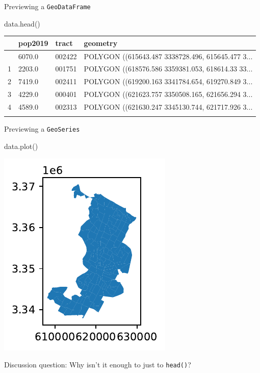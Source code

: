 \documentclass[
  ignorenonframetext,
]{beamer}
\newenvironment{Shaded}{\begin{snugshade}}{\end{snugshade}}
\newcommand{\NormalTok}[1]{\textcolor[rgb]{0.00,0.23,0.31}{#1}}
\begin{document}
\begin{frame}[fragile]{Previewing a \texttt{GeoDataFrame}}
\label{previewing-a-geodataframe}
\begin{Shaded}
\begin{Highlighting}[]
\NormalTok{data.head()}
\end{Highlighting}
\end{Shaded}

\begin{longtable}[]{@{}llll@{}}
\toprule\noalign{}
& pop2019 & tract & geometry \\
\midrule\noalign{}
\endhead
0 & 6070.0 & 002422 & POLYGON ((615643.487 3338728.496, 615645.477
3... \\
1 & 2203.0 & 001751 & POLYGON ((618576.586 3359381.053, 618614.33
33... \\
2 & 7419.0 & 002411 & POLYGON ((619200.163 3341784.654, 619270.849
3... \\
3 & 4229.0 & 000401 & POLYGON ((621623.757 3350508.165, 621656.294
3... \\
4 & 4589.0 & 002313 & POLYGON ((621630.247 3345130.744, 621717.926
3... \\
\bottomrule\noalign{}
\end{longtable}
\end{frame}

\begin{frame}[fragile]{Previewing a \texttt{GeoSeries}}
\label{previewing-a-geoseries}
\begin{Shaded}
\begin{Highlighting}[]
\NormalTok{data.plot()}
\end{Highlighting}
\end{Shaded}

\includegraphics{spatial_2_files/figure-beamer/cell-6-output-1.pdf}

Discussion question: Why isn't it enough to just to \texttt{head()}?
\end{frame}
\end{document}
